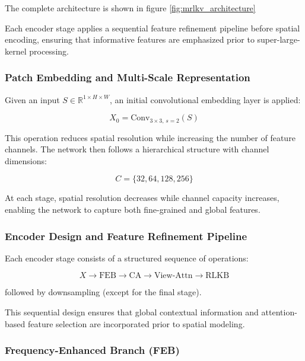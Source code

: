 The complete architecture is shown in figure \ref{fig:mrlkv_architecture}

Each encoder stage applies a sequential feature refinement pipeline before spatial encoding, ensuring that informative features are emphasized prior to super-large-kernel processing.

\subsubsection{Patch Embedding and Multi-Scale Representation}

Given an input $S \in \mathbb{R}^{1 \times H \times W}$, an initial convolutional embedding layer is applied:

\begin{equation}
X_0 = \mathrm{Conv}_{3\times3,\, s=2}(S)
\end{equation}

This operation reduces spatial resolution while increasing the number of feature channels. 
The network then follows a hierarchical structure with channel dimensions:

\begin{equation}
C = \{32, 64, 128, 256\}
\end{equation}

At each stage, spatial resolution decreases while channel capacity increases, enabling the network to capture both fine-grained and global features.

\subsubsection{Encoder Design and Feature Refinement Pipeline}

Each encoder stage consists of a structured sequence of operations:

\begin{equation}
X \rightarrow \mathrm{FEB} \rightarrow \mathrm{CA} \rightarrow \mathrm{View\text{-}Attn} \rightarrow \mathrm{RLKB}
\end{equation}

followed by downsampling (except for the final stage).

This sequential design ensures that global contextual information and attention-based feature selection are incorporated prior to spatial modeling.

\subsubsection{Frequency-Enhanced Branch (FEB)}

